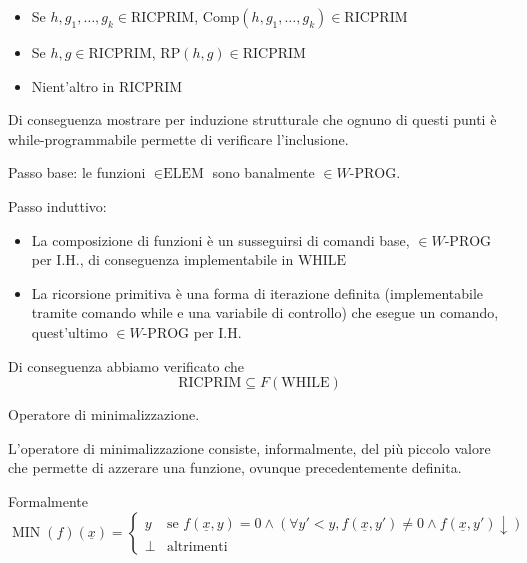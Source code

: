 \documentclass[12pt, answers]{exam}
\theoremstyle{plain}
\DeclareMathOperator{\MIN}{MIN}
\newcommand{\while}{\text{WHILE}}
\newcommand{\elem}{\text{ELEM}}
\newcommand{\wprog}{W\text{-PROG}}
\newcommand{\comp}{\text{Comp}}
\newcommand{\rp}{\text{RP}}
\newcommand{\ricprim}{\text{RICPRIM}}
\begin{document}
\begin{questions}
\begin{solution}
\begin{itemize}
                \item Se $h,g_1, \dots, g_k \in \ricprim$, $\comp(h, g_1, \dots, g_k) \in \ricprim$
                
                \item Se $h,g \in \ricprim$, $\rp (h,g) \in \ricprim$
                
                \item Nient'altro in $\ricprim$
            \end{itemize}
            
            Di conseguenza mostrare per induzione strutturale che ognuno di questi punti è while-programmabile permette di verificare l'inclusione.
            
            Passo base: le funzioni $\in \elem$ sono banalmente $\in \wprog$.
            
            Passo induttivo:
            \begin{itemize}
                \item La composizione di funzioni è un susseguirsi di comandi base, $\in \wprog$ per I.H., di conseguenza implementabile in $\while$
                
                \item La ricorsione primitiva è una forma di iterazione definita (implementabile tramite comando while e una variabile di controllo) che esegue un comando, quest'ultimo $\in \wprog$ per I.H.
            \end{itemize}
            
            Di conseguenza abbiamo verificato che
            $$ \ricprim \subseteq F(\while) $$
        \end{solution}
        
        \question Operatore di minimalizzazione.
        
        \begin{solution}
            L'operatore di minimalizzazione consiste, informalmente, del più piccolo valore che permette di azzerare una funzione, ovunque precedentemente definita. 
            
            Formalmente
            $$ \MIN (f) (\underline{x}) = \begin{cases}
                y & \text{se } f(\underline{x}, y) = 0 \wedge (\forall y' < y, f(\underline{x}, y') \neq 0 \wedge f(\underline{x}, y') \downarrow) \\
                \bot & \text{altrimenti}
            \end{cases}$$
        \end{solution}
        

\end{questions}
\end{document}
